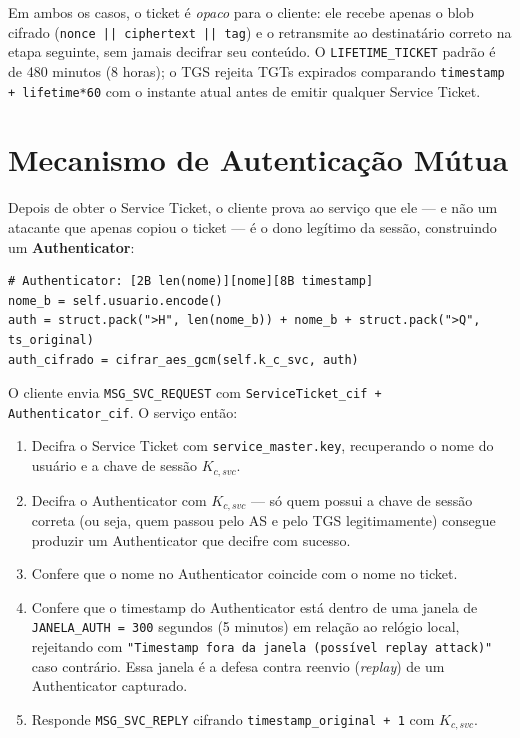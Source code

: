 \documentclass[11pt,a4paper]{article}
\begin{document}
Em ambos os casos, o ticket é \emph{opaco} para o cliente: ele recebe apenas o blob
cifrado (\texttt{nonce || ciphertext || tag}) e o retransmite ao destinatário correto na
etapa seguinte, sem jamais decifrar seu conteúdo. O \texttt{LIFETIME\_TICKET} padrão é de
480 minutos (8 horas); o TGS rejeita TGTs expirados comparando
\texttt{timestamp + lifetime*60} com o instante atual antes de emitir qualquer Service
Ticket.

\section{Mecanismo de Autenticação Mútua}

Depois de obter o Service Ticket, o cliente prova ao serviço que ele --- e não um
atacante que apenas copiou o ticket --- é o dono legítimo da sessão, construindo um
\textbf{Authenticator}:

\begin{lstlisting}
# Authenticator: [2B len(nome)][nome][8B timestamp]
nome_b = self.usuario.encode()
auth = struct.pack(">H", len(nome_b)) + nome_b + struct.pack(">Q", ts_original)
auth_cifrado = cifrar_aes_gcm(self.k_c_svc, auth)
\end{lstlisting}

O cliente envia \texttt{MSG\_SVC\_REQUEST} com \texttt{ServiceTicket\_cif + Authenticator\_cif}.
O serviço então:

\begin{enumerate}
    \item Decifra o Service Ticket com \texttt{service\_master.key}, recuperando o nome do
    usuário e a chave de sessão $K_{c,svc}$.
    \item Decifra o Authenticator com $K_{c,svc}$ --- só quem possui a chave de sessão
    correta (ou seja, quem passou pelo AS e pelo TGS legitimamente) consegue produzir um
    Authenticator que decifre com sucesso.
    \item Confere que o nome no Authenticator coincide com o nome no ticket.
    \item Confere que o timestamp do Authenticator está dentro de uma janela de
    \texttt{JANELA\_AUTH = 300} segundos (5 minutos) em relação ao relógio local, rejeitando
    com \texttt{"Timestamp fora da janela (possível replay attack)"} caso contrário. Essa
    janela é a defesa contra reenvio (\emph{replay}) de um Authenticator capturado.
    \item Responde \texttt{MSG\_SVC\_REPLY} cifrando \texttt{timestamp\_original + 1} com
    $K_{c,svc}$.
\end{enumerate}
\end{document}
